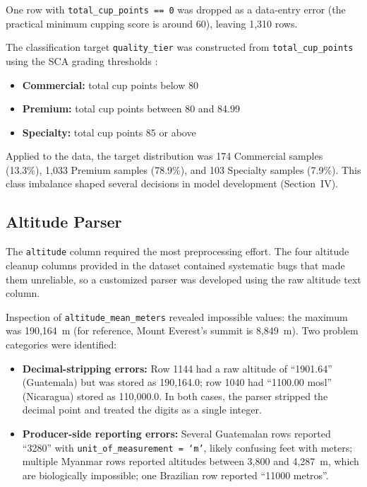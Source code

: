 \documentclass[12pt, a4paper]{article}
\begin{document}
One row with \texttt{total\_cup\_points == 0} was dropped as a data-entry error (the practical
minimum cupping score is around 60), leaving 1,310 rows.

The classification target \texttt{quality\_tier} was constructed from \texttt{total\_cup\_points}
using the SCA grading thresholds \citep{SCA2005}:
\begin{itemize}
  \item \textbf{Commercial:} total cup points below 80
  \item \textbf{Premium:} total cup points between 80 and 84.99
  \item \textbf{Specialty:} total cup points 85 or above
\end{itemize}

Applied to the data, the target distribution was 174 Commercial samples (13.3\%), 1,033 Premium
samples (78.9\%), and 103 Specialty samples (7.9\%). This class imbalance shaped several decisions
in model development (Section~IV).

\subsection{Altitude Parser}

The \texttt{altitude} column required the most preprocessing effort. The four altitude cleanup
columns provided in the dataset contained systematic bugs that made them unreliable, so a
customized parser was developed using the raw altitude text column.

Inspection of \texttt{altitude\_mean\_meters} revealed impossible values: the maximum was
190,164~m (for reference, Mount Everest's summit is 8,849~m). Two problem categories were
identified:

\begin{itemize}
  \item \textbf{Decimal-stripping errors:} Row 1144 had a raw altitude of ``1901.64'' (Guatemala)
        but was stored as 190,164.0; row 1040 had ``1100.00 mosl'' (Nicaragua) stored as 110,000.0.
        In both cases, the parser stripped the decimal point and treated the digits as a single integer.
  \item \textbf{Producer-side reporting errors:} Several Guatemalan rows reported ``3280'' with
        \texttt{unit\_of\_measurement = `m'}, likely confusing feet with meters; multiple Myanmar
        rows reported altitudes between 3,800 and 4,287~m, which are biologically impossible; one
        Brazilian row reported ``11000 metros''.
\end{itemize}
\end{document}
